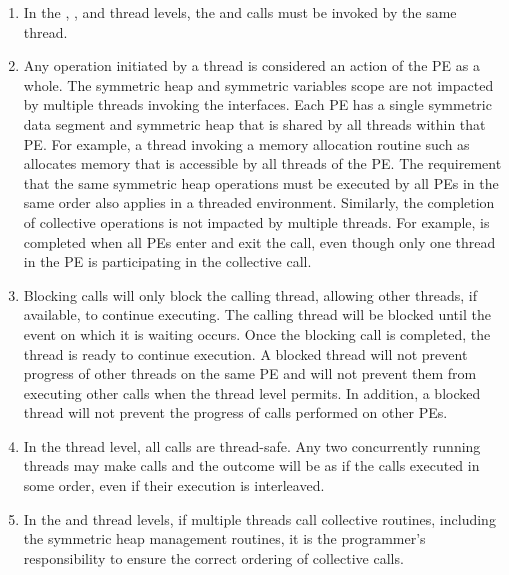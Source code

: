 \begin{enumerate}
\item
In the , , and
 thread levels, the  and
 calls must be invoked by the same thread.

\item
Any \openshmem operation initiated by a thread is considered an action of the
\ac{PE} as a whole. The symmetric heap and symmetric variables scope are not
impacted by multiple threads invoking the \openshmem interfaces.
Each \ac{PE} has a single symmetric data segment and symmetric heap that is shared by
all threads within that \ac{PE}.  For example, a thread invoking a memory allocation
routine such as  allocates memory that is accessible by
all threads of the \ac{PE}. The requirement that the same symmetric heap operations
must be executed by all \acp{PE} in the same order also applies in a threaded
environment. Similarly, the completion of collective operations is not impacted
by multiple threads. For example,  is completed when
all \acp{PE} enter and exit the  call, even though
only one thread in the \ac{PE} is participating in the collective call.

\item Blocking \openshmem calls will only block the calling thread, allowing
other threads, if available, to continue executing. The calling thread will
be blocked until the event on which it is waiting occurs. Once the blocking call is
completed, the thread is ready to continue execution. A blocked thread
will not prevent progress of other threads on the same \ac{PE} and will not
prevent them from executing other \openshmem calls when the thread level permits.
In addition, a blocked thread will not prevent the progress of \openshmem calls
performed on other \acp{PE}.

\item In the  thread level, all \openshmem calls are thread-safe.
Any two concurrently running threads may make \openshmem calls and the outcome
will be as if the calls executed in some order, even if their execution is interleaved.

\item In the  and  thread levels,
if multiple threads call collective routines, including the symmetric heap
management routines, it is the programmer's responsibility to ensure the
correct ordering of collective calls.

\end{enumerate}
